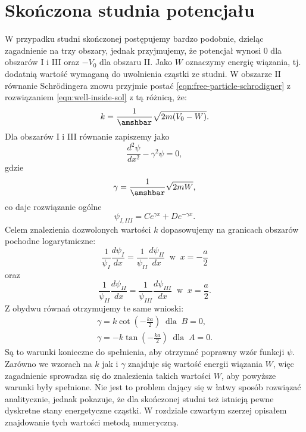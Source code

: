 \documentclass{SGGW-thesis}
\begin{document}
	\section{Skończona studnia potencjału}
	W przypadku studni skończonej postępujemy bardzo podobnie, dzieląc zagadnienie na trzy obszary, jednak przyjmujemy, że potencjał wynosi 0 dla obszarów I i III oraz $-V_0$ dla obszaru II. Jako $W$ oznaczymy energię wiązania, tj. dodatnią wartość wymaganą do uwolnienia cząstki ze studni. W obszarze II równanie Schrödingera znowu przyjmie postać \ref{eqn:free-particle-schrodigner} z rozwiązaniem \ref{eqn:well-inside-sol} z tą różnicą, że:
	\begin{equation}\label{eqn:k-fi-well}
	k=\frac{1}{\amshbar}\sqrt{2m(V_0-W)}.
	\end{equation}
Dla obszarów I i III równanie zapiszemy jako
	\begin{equation}
	\frac{d^2\psi}{dx^2}-\gamma^2 \psi = 0,
	\end{equation}
gdzie
	\begin{equation}\label{eqn:gamma-fi-well}
	\gamma = \frac{1}{\amshbar}\sqrt{2mW},
	\end{equation}
co daje rozwiązanie ogólne
	\begin{equation}
	\psi_{I,III}= Ce^{\gamma x} + De^{-\gamma x}.
	\end{equation}
Celem znalezienia dozwolonych wartości $k$ dopasowujemy na granicach obszarów pochodne logarytmiczne:
	\begin{equation}
	\frac{1}{\psi_I}\frac{d\psi_I}{dx} = \frac{1}{\psi_{II}}\frac{d\psi_{II}}{dx}
	\;\; \textrm{w}\;\; 
	x=-\frac{a}{2}
	\end{equation}
oraz
	\begin{equation}
	\frac{1}{\psi_{II}}\frac{d\psi_{II}}{dx} = \frac{1}{\psi_{III}}\frac{d\psi_{III}}{dx}
	\;\; \textrm{w} \;\;
	x=\frac{a}{2}.
	\end{equation}
Z obydwu równań otrzymujemy te same wnioski:
	\begin{equation}\label{eqn:fi-well-k-gamma}
	\begin{split}
	\gamma = k \cot\left(-\frac{ka}{2}\right)\;\; \textrm{dla} \;\; B = 0,\\
	\gamma = -k \tan\left(-\frac{ka}{2}\right)\;\; \textrm{dla} \;\; A = 0.
	\end{split}
	\end{equation}
Są to warunki konieczne do spełnienia, aby otrzymać poprawny wzór funkcji $\psi$.
Zarówno we wzorach na $k$ jak i $\gamma$ znajduje się wartość energii wiązania $W$, więc zagadnienie sprowadza się do znalezienia takich wartości $W$, aby powyższe warunki były spełnione. Nie jest to problem dający się w łatwy sposób rozwiązać analitycznie, jednak pokazuje, że dla skończonej studni też istnieją pewne dyskretne stany energetyczne cząstki. W rozdziale czwartym szerzej opisałem znajdowanie tych wartości metodą numeryczną.
\end{document}
